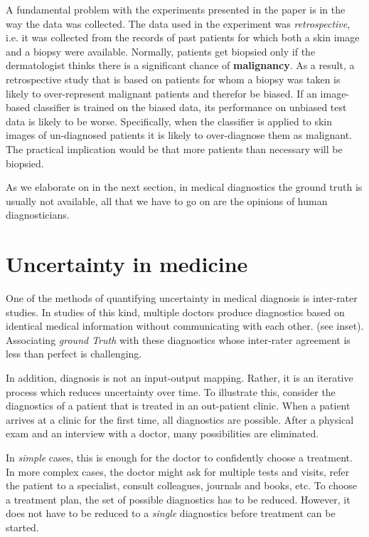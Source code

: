 \documentclass[11pt]{pnas-new}
\begin{document}
A fundamental problem with the experiments presented in the paper is in the way the data was
collected. The data used in the experiment was {\em retrospective},
i.e. it was collected from the records of past patients for which both
a skin image and a biopsy were available. Normally, patients get
biopsied only if the dermatologist thinks there is a significant
chance of {\bf malignancy}. As a result, a retrospective study that is
based on patients for whom a biopsy was taken is likely to
over-represent malignant patients and therefor be biased. If an image-based classifier
is trained on the biased data, its performance on unbiased test data
is likely to be worse. Specifically, when the classifier is applied to skin
images of un-diagnosed patients it is likely to over-diagnose them as
malignant. The practical implication would be that more patients than
necessary will be biopsied. 

As we elaborate on in the next section, in medical diagnostics the
ground truth is usually not available, all that we have to go on are
the opinions of human diagnosticians.

\section{Uncertainty in medicine}


One of the methods of quantifying uncertainty in medical diagnosis is inter-rater studies.
In studies of this kind, multiple doctors produce diagnostics
based on identical medical information without communicating with each other. (see inset).
Associating {\em ground Truth} with these diagnostics whose inter-rater agreement is less than perfect is challenging.
 
In addition, diagnosis is not an
input-output mapping. Rather, it is an iterative process which reduces
uncertainty over time. To illustrate this, consider the diagnostics of
a patient that is treated in an out-patient clinic.  When a patient
arrives at a clinic for the first time, all diagnostics are
possible. After a physical exam and an interview with a doctor, many
possibilities are eliminated.


In {\em simple} cases, this is enough
for the doctor to confidently choose a treatment. In more complex
cases, the doctor might ask for multiple tests and visits, refer the
patient to a specialist, consult colleagues, journals and books,
etc. To choose a treatment plan, the set of possible diagnostics has
to be reduced.  However, it does not have to be reduced to a {\em
  single} diagnostics before treatment can be started.
\end{document}
